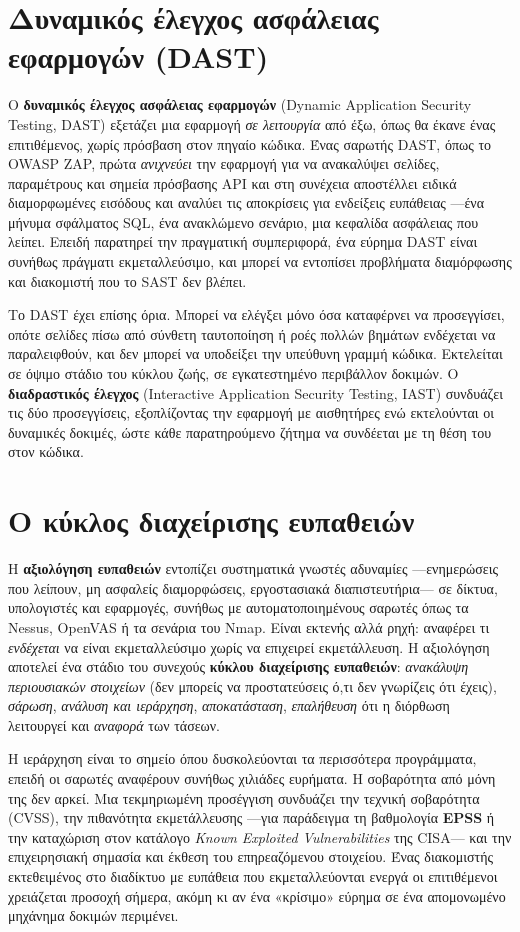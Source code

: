 \documentclass[11pt,openany]{book}
\begin{document}
\section{Δυναμικός έλεγχος ασφάλειας εφαρμογών (DAST)}\label{sec:10.2}
Ο \textbf{δυναμικός έλεγχος ασφάλειας εφαρμογών} (Dynamic Application Security Testing, DAST) εξετάζει μια εφαρμογή \emph{σε λειτουργία} από έξω, όπως θα έκανε ένας επιτιθέμενος, χωρίς πρόσβαση στον πηγαίο κώδικα. Ένας σαρωτής DAST, όπως το OWASP ZAP, πρώτα \emph{ανιχνεύει} την εφαρμογή για να ανακαλύψει σελίδες, παραμέτρους και σημεία πρόσβασης API και στη συνέχεια αποστέλλει ειδικά διαμορφωμένες εισόδους και αναλύει τις αποκρίσεις για ενδείξεις ευπάθειας —ένα μήνυμα σφάλματος SQL, ένα ανακλώμενο σενάριο, μια κεφαλίδα ασφάλειας που λείπει. Επειδή παρατηρεί την πραγματική συμπεριφορά, ένα εύρημα DAST είναι συνήθως πράγματι εκμεταλλεύσιμο, και μπορεί να εντοπίσει προβλήματα διαμόρφωσης και διακομιστή που το SAST δεν βλέπει.

Το DAST έχει επίσης όρια. Μπορεί να ελέγξει μόνο όσα καταφέρνει να προσεγγίσει, οπότε σελίδες πίσω από σύνθετη ταυτοποίηση ή ροές πολλών βημάτων ενδέχεται να παραλειφθούν, και δεν μπορεί να υποδείξει την υπεύθυνη γραμμή κώδικα. Εκτελείται σε όψιμο στάδιο του κύκλου ζωής, σε εγκατεστημένο περιβάλλον δοκιμών. Ο \textbf{διαδραστικός έλεγχος} (Interactive Application Security Testing, IAST) συνδυάζει τις δύο προσεγγίσεις, εξοπλίζοντας την εφαρμογή με αισθητήρες ενώ εκτελούνται οι δυναμικές δοκιμές, ώστε κάθε παρατηρούμενο ζήτημα να συνδέεται με τη θέση του στον κώδικα.

\section{Ο κύκλος διαχείρισης ευπαθειών}\label{sec:10.3}
Η \textbf{αξιολόγηση ευπαθειών} εντοπίζει συστηματικά γνωστές αδυναμίες —ενημερώσεις που λείπουν, μη ασφαλείς διαμορφώσεις, εργοστασιακά διαπιστευτήρια— σε δίκτυα, υπολογιστές και εφαρμογές, συνήθως με αυτοματοποιημένους σαρωτές όπως τα Nessus, OpenVAS ή τα σενάρια του Nmap. Είναι εκτενής αλλά ρηχή: αναφέρει τι \emph{ενδέχεται} να είναι εκμεταλλεύσιμο χωρίς να επιχειρεί εκμετάλλευση. Η αξιολόγηση αποτελεί ένα στάδιο του συνεχούς \textbf{κύκλου διαχείρισης ευπαθειών}: \emph{ανακάλυψη περιουσιακών στοιχείων} (δεν μπορείς να προστατεύσεις ό,τι δεν γνωρίζεις ότι έχεις), \emph{σάρωση}, \emph{ανάλυση και ιεράρχηση}, \emph{αποκατάσταση}, \emph{επαλήθευση} ότι η διόρθωση λειτουργεί και \emph{αναφορά} των τάσεων.

Η ιεράρχηση είναι το σημείο όπου δυσκολεύονται τα περισσότερα προγράμματα, επειδή οι σαρωτές αναφέρουν συνήθως χιλιάδες ευρήματα. Η σοβαρότητα από μόνη της δεν αρκεί. Μια τεκμηριωμένη προσέγγιση συνδυάζει την τεχνική σοβαρότητα (CVSS), την πιθανότητα εκμετάλλευσης —για παράδειγμα τη βαθμολογία \textbf{EPSS} ή την καταχώριση στον κατάλογο \emph{Known Exploited Vulnerabilities} της CISA— και την επιχειρησιακή σημασία και έκθεση του επηρεαζόμενου στοιχείου. Ένας διακομιστής εκτεθειμένος στο διαδίκτυο με ευπάθεια που εκμεταλλεύονται ενεργά οι επιτιθέμενοι χρειάζεται προσοχή σήμερα, ακόμη κι αν ένα «κρίσιμο» εύρημα σε ένα απομονωμένο μηχάνημα δοκιμών περιμένει.
\end{document}
